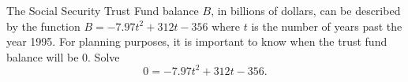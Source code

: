 \documentclass[../mathNotesPreamble]{subfiles}
\begin{document}
    \begin{ex*}
      The Social Security Trust Fund balance $B$, in billions of dollars, can be described by the function
        $B=-7.97t^2+312t-356$
      where $t$ is the number of years past the year 1995. For planning purposes, it is important to know when the trust fund balance will be $0$. Solve
        \[0=-7.97t^2+312t-356.\]
    \end{ex*}

  \pagebreak
\end{document}
